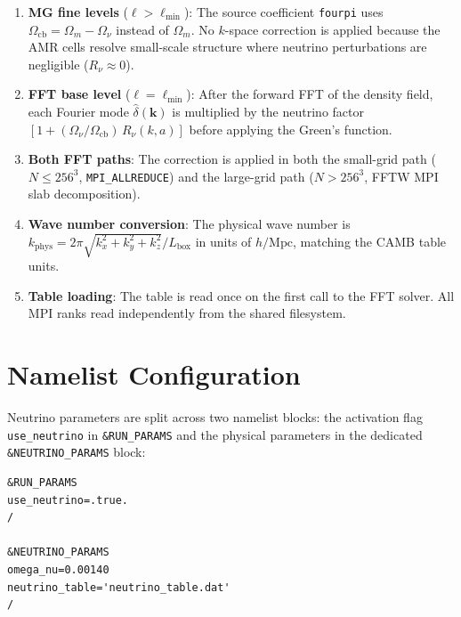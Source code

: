 \documentclass[11pt,fleqn]{book}
\begin{document}
\begin{enumerate}[nosep]
  \item \textbf{MG fine levels} ($\ell > \ell_{\min}$): The source coefficient
    \texttt{fourpi} uses $\Omega_{\mathrm{cb}} = \Omega_m - \Omega_\nu$
    instead of $\Omega_m$.  No $k$-space correction is applied because the
    AMR cells resolve small-scale structure where neutrino perturbations are
    negligible ($R_\nu \approx 0$).

  \item \textbf{FFT base level} ($\ell = \ell_{\min}$): After the forward
    FFT of the density field, each Fourier mode $\hat\delta(\mathbf{k})$
    is multiplied by the neutrino factor
    $[1 + (\Omega_\nu/\Omega_{\mathrm{cb}})\,R_\nu(k,a)]$
    before applying the Green's function.

  \item \textbf{Both FFT paths}: The correction is applied in both the
    small-grid path ($N \le 256^3$, \texttt{MPI\_ALLREDUCE}) and the
    large-grid path ($N > 256^3$, FFTW MPI slab decomposition).

  \item \textbf{Wave number conversion}: The physical wave number is
    $k_{\text{phys}} = 2\pi\sqrt{k_x^2+k_y^2+k_z^2}/L_{\text{box}}$
    in units of $h/\text{Mpc}$, matching the CAMB table units.

  \item \textbf{Table loading}: The table is read once on the first
    call to the FFT solver.  All MPI ranks read independently from the
    shared filesystem.
\end{enumerate}

\section{Namelist Configuration}

Neutrino parameters are split across two namelist blocks: the activation
flag \texttt{use\_neutrino} in \texttt{\&RUN\_PARAMS} and the physical
parameters in the dedicated \texttt{\&NEUTRINO\_PARAMS} block:

\begin{codebox}[Neutrino configuration example ($\Sigma m_\nu=0.06\,$eV)]
\begin{lstlisting}[style=fortran,numbers=none]
&RUN_PARAMS
use_neutrino=.true.
/

&NEUTRINO_PARAMS
omega_nu=0.00140
neutrino_table='neutrino_table.dat'
/
\end{lstlisting}
\end{codebox}
\end{document}
